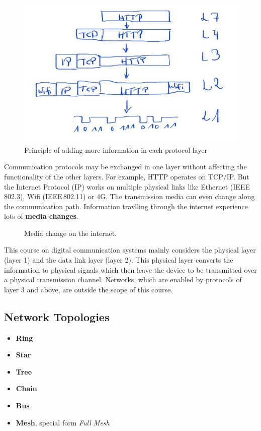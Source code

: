 \begin{figure}[H]
	\centering
	\includegraphics{../chapter01/Frame_Wrapping.jpg}
	\caption{Principle of adding more information in each protocol layer}
	\label{fig:ch01:frame_construction}
\end{figure}

Communication protocols may be exchanged in one layer without affecting the functionality of the other layers. For example, HTTP operates on TCP/IP. But the Internet Protocol (IP) works on multiple physical links like Ethernet (IEEE\,802.3), Wifi (IEEE\,802.11) or 4G. The transmission media can even change along the communication path. Information travlling through the internet experience lots of \textbf{media changes}.


\begin{figure}[H]
	\centering
	\caption{Media change on the internet. }
	\label{fig:ch01:media_changes}
\end{figure}

This course on digital communication systems mainly considers the physical layer (layer 1) and the data link layer (layer 2). This physical layer converts the information to physical signals which then leave the device to be transmitted over a physical transmission channel. Networks, which are enabled by protocols of layer 3 and above, are outside the scope of this course.


\subsection{Network Topologies}

\begin{itemize}
	\item \textbf{Ring}
	\item \textbf{Star}
	\item \textbf{Tree}
	\item \textbf{Chain}
	\item \textbf{Bus}
	\item \textbf{Mesh}, special form \emph{Full Mesh}
\end{itemize}

